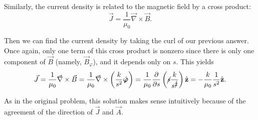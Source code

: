 \documentclass{article}
\newcommand{\zhat}{\hat{\textbf{z}}}
\newcommand{\vphihat}{\hat{\bm{\varphi}}}
\newcommand{\del}{\vec{\nabla}}
\begin{document}
Similarly, the current density is related to the magnetic field by a cross product:
\begin{equation}
	\vec{J} = \frac{1}{\mu_0}\del\times\vec{B}.
\end{equation}

Then we can find the current density by taking the curl of our previous answer. Once again, only one term of this cross product is nonzero since there is only one component of $\vec{B}$ (namely, $\vec{B}_\varphi$), and it depends only on $s$. This yields
\begin{align}
	\vec{J} = \frac{1}{\mu_0}\del\times\vec{B} = \frac{1}{\mu_0}\del\times\left(  \frac{k}{s^2}\vphihat\right) = \frac{1}{\mu_0}\frac{\partial}{\partial s}\left( \cancel{s}\frac{k}{s^{\cancel{2}}} \right)\zhat = -\frac{k}{\mu_0}\frac{1}{s^2}\zhat.
\end{align}

As in the original problem, this solution makes sense intuitively because of the agreement of the direction of $\vec{J}$ and $\vec{A}$.

\clearpage
\end{document}
